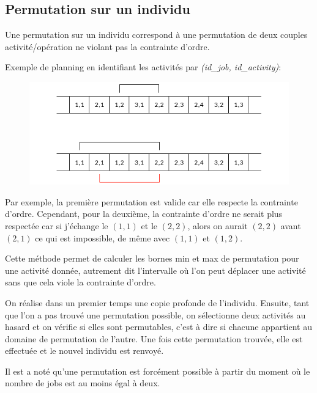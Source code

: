 \subsection{Permutation sur un individu}

Une permutation sur un individu correspond à une permutation de deux couples activité/opération ne violant pas la contrainte d'ordre. 

Exemple de planning en identifiant les activités par \textit{(id\_job, id\_activity)}:

\begin{figure}[!h]
    \centering
    \includegraphics[scale=0.8]{report/Pictures/permutation.png}
\end{figure}

Par exemple, la première permutation est valide car elle respecte la contrainte d'ordre. Cependant, pour la deuxième, la contrainte d'ordre ne serait plus respectée car si j'échange le $(1,1)$ et le $(2,2)$, alors on aurait $(2,2)$ avant $(2,1)$ ce qui est impossible, de même avec $(1,1)$ et $(1,2)$. 



\newpage

Cette méthode permet de calculer les bornes min et max de permutation pour une activité donnée, autrement dit l'intervalle où l'on peut déplacer une activité sans que cela viole la contrainte d'ordre.



On réalise dans un premier temps une copie profonde de l'individu. Ensuite, tant que l'on a pas trouvé une permutation possible, on sélectionne deux activités au hasard et on vérifie si elles sont permutables, c'est à dire si chacune appartient au domaine de permutation de l'autre. Une fois cette permutation trouvée, elle est effectuée et le nouvel individu est renvoyé.

Il est a noté qu'une permutation est forcément possible à partir du moment où le nombre de jobs est au moins égal à deux.

